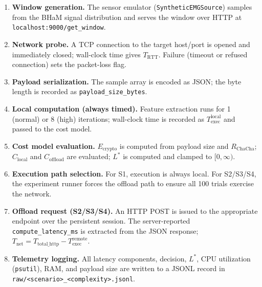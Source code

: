 \documentclass[10pt,twocolumn]{article}
\begin{document}
\begin{enumerate}[leftmargin=1.5em]
    \item \textbf{Window generation.} The sensor emulator
          (\texttt{SyntheticEMGSource}) samples from the BHaM signal
          distribution and serves the window over HTTP at
          \texttt{localhost:9000/get\_window}.

    \item \textbf{Network probe.} A TCP connection to the target host/port is
          opened and immediately closed; wall-clock time gives $T_{\text{RTT}}$.
          Failure (timeout or refused connection) sets the packet-loss flag.

    \item \textbf{Payload serialization.} The sample array is encoded as JSON;
          the byte length is recorded as \texttt{payload\_size\_bytes}.

    \item \textbf{Local computation (always timed).} Feature extraction runs
          for 1 (normal) or 8 (high) iterations; wall-clock time is recorded
          as $T_{\text{exec}}^{\text{local}}$ and passed to the cost model.

    \item \textbf{Cost model evaluation.}
          $E_{\text{crypto}}$ is computed from payload size and $R_{\text{ChaCha}}$;
          $C_{\text{local}}$ and $C_{\text{offload}}$ are evaluated;
          $L^*$ is computed and clamped to $[0, \infty)$.

    \item \textbf{Execution path selection.}  For S1, execution is always
          local.  For S2/S3/S4, the experiment runner forces the offload path
          to ensure all 100 trials exercise the network.

    \item \textbf{Offload request (S2/S3/S4).}  An HTTP POST is issued to
          the appropriate endpoint over the persistent session.  The
          server-reported \texttt{compute\_latency\_ms} is extracted from the
          JSON response; $T_{\text{net}} = T_{\text{total\_http}} -
          T_{\text{exec}}^{\text{remote}}$.

    \item \textbf{Telemetry logging.}  All latency components, decision,
          $L^*$, CPU utilization (\texttt{psutil}), RAM, and payload size
          are written to a JSONL record in \texttt{raw/<scenario>\_<complexity>.jsonl}.
\end{enumerate}
\end{document}
